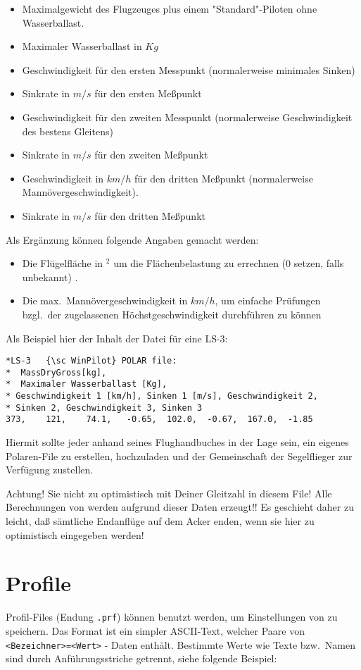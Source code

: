\begin{itemize}
\item Maximalgewicht des Flugzeuges  plus einem "Standard"-Piloten ohne Wasserballast.
\item Maximaler Wasserballast in $Kg$
\item Geschwindigkeit für den ersten Messpunkt (normalerweise minimales Sinken)
\item Sinkrate in $m/s$ für den ersten Meßpunkt
\item Geschwindigkeit für den zweiten  Messpunkt (normalerweise Geschwindigkeit des bestens
    Gleitens)
\item Sinkrate in $m/s$ für den zweiten Meßpunkt
\item Geschwindigkeit in $km/h$ für den dritten Meßpunkt  (normalerweise Mannövergeschwindigkeit).
\item Sinkrate in $m/s$ für den dritten Meßpunkt
\end{itemize}

Als Ergänzung können folgende Angaben gemacht werden:
\begin{itemize}
\item Die Flügelfläche in $^2$ um die Flächenbelastung zu errechnen  (0 setzen, falls unbekannt) .
\item Die max.\  Mannövergeschwindigkeit in $km/h$, um einfache Prüfungen bzgl.\
 der zugelassenen Höchstgeschwindigkeit durchführen zu können
\end{itemize}

Als Beispiel hier der Inhalt der Datei für eine LS-3:
\begin{verbatim}
*LS-3	{\sc WinPilot} POLAR file:
*  MassDryGross[kg],
*  Maximaler Wasserballast [Kg],
* Geschwindigkeit 1 [km/h], Sinken 1 [m/s], Geschwindigkeit 2,
* Sinken 2, Geschwindigkeit 3, Sinken 3
373,	121,	74.1,	-0.65,	102.0,	-0.67,	167.0,	-1.85
\end{verbatim}

Hiermit sollte jeder anhand seines Flughandbuches in der Lage sein, ein eigenes Polaren-File zu
erstellen, hochzuladen  und der Gemeinschaft der Segelflieger zur Verfügung zustellen.

\tip Achtung! Sie nicht zu optimistisch mit Deiner Gleitzahl in diesem File!
Alle Berechnungen von  \xc werden aufgrund dieser Daten erzeugt!!  Es geschieht daher zu
leicht, daß sämtliche Endanflüge auf dem Acker enden, wenn sie hier zu optimistisch
eingegeben werden!


\section{Profile}
Profil-Files (Endung \verb|.prf|) können benutzt werden, um Einstellungen von \xc zu speichern.
Das Format ist ein simpler ASCII-Text, welcher Paare von  \verb|<Bezeichner>=<Wert>|  - Daten enthält.
Bestimmte Werte wie Texte bzw.\ Namen sind durch Anführungsstriche getrennt, siehe folgende Beispiel:

